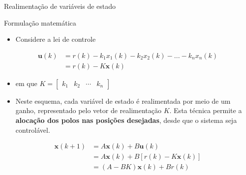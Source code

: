 \begin{frame}{Realimentação de variáveis de estado}
\begin{block}{Formulação matemática}
\begin{itemize}
    \item Considere a lei de controle
\end{itemize}
\begin{align*}
    \bm{u}(k) &= r(k) - k_1x_1(k) - k_2x_2(k) - ... - k_nx_n(k) \\
    &= r(k) - K\bm{x}(k)
\end{align*}
\vspace{-0.3cm}
\begin{itemize}
    \item[] em que $K = \begin{bmatrix}
    k_1 & k_2 & \cdots & k_n
    \end{bmatrix}$
    \item Neste esquema, cada variável de estado é realimentada por meio de um ganho, representado pelo vetor de realimentação $K$. Esta técnica permite a \textbf{alocação dos polos nas posições desejadas}, desde que o sistema seja controlável.
\end{itemize}
\begin{align*}
    \bm{x}(k+1) &= A\bm{x}(k) + B\bm{u}(k) \\
    &= A\bm{x}(k) + B[r(k) - K\bm{x}(k)] \\
    &= (A - BK)\bm{x}(k) + Br(k)
\end{align*}
\end{block}
\end{frame}

